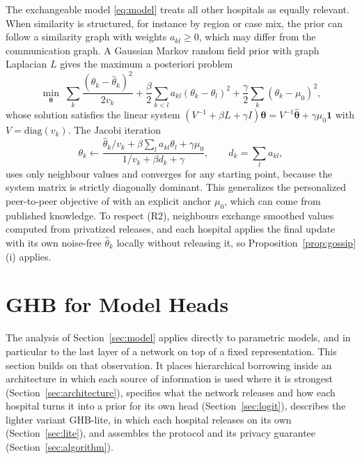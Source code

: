 \documentclass[acmsmall,screen,review]{acmart}
\theoremstyle{acmdefinition}
\begin{document}
The exchangeable model \eqref{eq:model} treats all other hospitals as equally relevant. When similarity is structured, for instance by region or case mix, the prior can follow a similarity graph with weights $a_{kl}\ge 0$, which may differ from the communication graph. A Gaussian Markov random field prior \cite{rue2005gaussian} with graph Laplacian $L$ gives the maximum a posteriori problem
\begin{equation}\label{eq:gmrf}
\min_{\boldsymbol{\theta}}\;\sum_k\frac{(\theta_k-\hat{\theta}_k)^2}{2v_k}+\frac{\beta}{2}\sum_{k<l}a_{kl}(\theta_k-\theta_l)^2+\frac{\gamma}{2}\sum_k(\theta_k-\mu_0)^2,
\end{equation}
whose solution satisfies the linear system $(V^{-1}+\beta L+\gamma I)\boldsymbol{\theta}=V^{-1}\hat{\boldsymbol{\theta}}+\gamma\mu_0\mathbf{1}$ with $V=\mathrm{diag}(v_k)$. The Jacobi iteration
\[
\theta_k\leftarrow\frac{\hat{\theta}_k/v_k+\beta\sum_l a_{kl}\theta_l+\gamma\mu_0}{1/v_k+\beta d_k+\gamma},\qquad d_k=\textstyle\sum_l a_{kl},
\]
uses only neighbour values and converges for any starting point, because the system matrix is strictly diagonally dominant. This generalizes the personalized peer-to-peer objective of \citet{vanhaesebrouck2017decentralized} with an explicit anchor $\mu_0$, which can come from published knowledge. To respect (R2), neighbours exchange smoothed values computed from privatized releases, and each hospital applies the final update with its own noise-free $\hat{\theta}_k$ locally without releasing it, so Proposition~\ref{prop:gossip}(i) applies.

\section{GHB for Model Heads}\label{sec:heads}

The analysis of Section~\ref{sec:model} applies directly to parametric models, and in particular to the last layer of a network on top of a fixed representation. This section builds on that observation. It places hierarchical borrowing inside an architecture in which each source of information is used where it is strongest (Section~\ref{sec:architecture}), specifies what the network releases and how each hospital turns it into a prior for its own head (Section~\ref{sec:logit}), describes the lighter variant GHB-lite, in which each hospital releases on its own (Section~\ref{sec:lite}), and assembles the protocol and its privacy guarantee (Section~\ref{sec:algorithm}).
\end{document}
